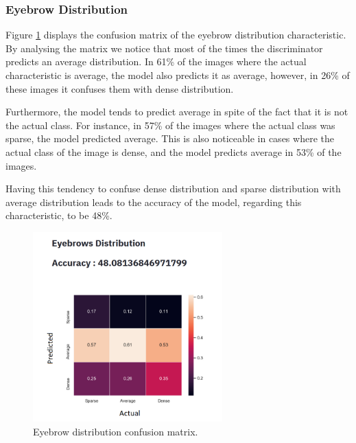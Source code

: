 \documentclass[12pt,a4paper,oneside]{memoir}
\begin{document}
\subsubsection{Eyebrow Distribution}

Figure \ref{fig:eyebrow_lock_distribution} displays the confusion matrix of the eyebrow distribution characteristic. By analysing the matrix we notice that most of the times the discriminator predicts an average distribution. In 61\% of the images where the actual characteristic is average, the model also predicts it as average, however, in 26\% of these images it confuses them with dense distribution.


\par

Furthermore, the model tends to predict average in spite of the fact that it is not the actual class. For instance, in 57\% of the images where the actual class was sparse, the model predicted average. This is also noticeable in cases where the actual class of the image is dense, and the model predicts average in 53\% of the images.    


\par

Having this tendency to confuse dense distribution and sparse distribution with average distribution leads to the accuracy of the model, regarding this characteristic, to be 48\%. 

\begin{figure}[H]
\centering
\includegraphics[width=0.65\textwidth]{images/eyebrows_lock_distribution.png}
\caption{Eyebrow distribution confusion matrix.}
\centering
\label{fig:eyebrow_lock_distribution}
\end{figure}
\end{document}
